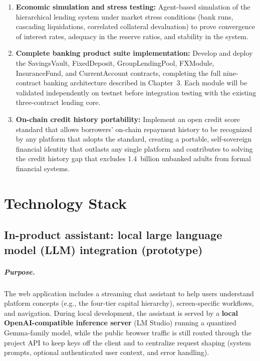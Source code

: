 \documentclass[12pt,a4paper]{report}
\begin{document}
\begin{enumerate}[noitemsep]
\item \textbf{Economic simulation and stress testing:} Agent-based simulation of the hierarchical lending system under market stress conditions (bank runs, cascading liquidations, correlated collateral devaluation) to prove convergence of interest rates, adequacy in the reserve ratios, and stability in the system.
\item \textbf{Complete banking product suite implementation:} Develop and deploy the SavingsVault, FixedDeposit, GroupLendingPool, FXModule, InsuranceFund, and CurrentAccount contracts, completing the full nine-contract banking architecture described in Chapter~3. Each module will be validated independently on testnet before integration testing with the existing three-contract lending core.
\item \textbf{On-chain credit history portability:} Implement an open credit score standard that allows borrowers' on-chain repayment history to be recognized by any platform that adopts the standard, creating a portable, self-sovereign financial identity that outlasts any single platform and contributes to solving the credit history gap that excludes 1.4~billion unbanked adults from formal financial systems.
\end{enumerate}


\appendix

\chapter{Technology Stack}

\section{In-product assistant: local large language model (LLM) integration (prototype)}

\paragraph{Purpose.}
The web application includes a streaming chat assistant to help users understand platform concepts (e.g., the four-tier capital hierarchy), screen-specific workflows, and navigation. During local development, the assistant is served by a \textbf{local OpenAI-compatible inference server} (LM Studio) running a quantized Gemma-family model, while the public browser traffic is still routed through the project API to keep keys off the client and to centralize request shaping (system prompts, optional authenticated user context, and error handling).
\end{document}
